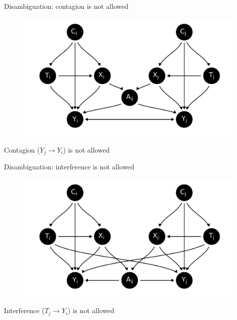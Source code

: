 \documentclass{beamer}
\theoremstyle{remark}
\begin{document}
\appendix

\begin{frame}{Disambiguation: contagion is not allowed}

    \centering

    \begin{figure}
        \includegraphics[scale=0.65]{figures/dags/contagion.png}
        \label{fig:contagion}
    \end{figure}

    Contagion ($Y_j \to Y_i$) is not allowed

\end{frame}

\begin{frame}{Disambiguation: interference is not allowed}

    \centering

    \begin{figure}
        \includegraphics[scale=0.65]{figures/dags/interference.png}
        \label{fig:interference}
    \end{figure}

    Interference ($T_j \to Y_i$) is not allowed

\end{frame}
\end{document}
